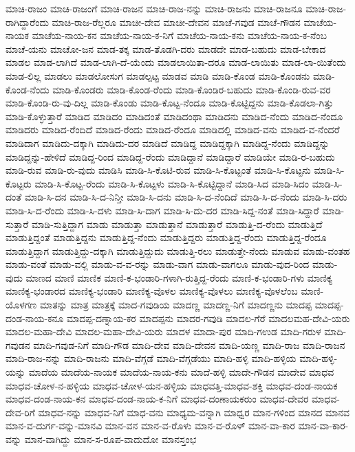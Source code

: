 {ಮಾಚಿ-ರಾಜಂ
ಮಾಚಿ-ರಾಜಂಗೆ
ಮಾಚಿ-ರಾಜನ
ಮಾಚಿ-ರಾಜ-ನನ್ನು
ಮಾಚಿ-ರಾಜನು
ಮಾಚಿ-ರಾಜನೂ
ಮಾಚಿ-ರಾಜ-ರಾಗಿದ್ದಾರೆಂದು
ಮಾಚಿ-ರಾಜ-ರೆಲ್ಲರೂ
ಮಾಚೀ-ದೇವ
ಮಾಚೀ-ದೇವನ
ಮಾಚೆ-ಗವುಡ
ಮಾಚೆ-ಗೌಡನ
ಮಾಚೆಯ-ನಾಯಕ
ಮಾಚೆಯ-ನಾಯ-ಕನ
ಮಾಚೆಯ-ನಾಯ-ಕ-ನಿಗೆ
ಮಾಚೆಯ-ನಾಯ-ಕನು
ಮಾಚೆಯ-ನಾಯ-ಕ-ನೆಂಬ
ಮಾಚೆ-ಯನು
ಮಾಚೋ-ಜನ
ಮಾಡ-ತಕ್ಕ
ಮಾಡ-ತೊಡಗಿ-ದರು
ಮಾಡದೇ
ಮಾಡ-ಬಹುದು
ಮಾಡ-ಬೇಕಾದ
ಮಾಡಲ
ಮಾಡ-ಲಾಗಿದೆ
ಮಾಡ-ಲಾಗಿ-ದೆ-ಯೆಂದು
ಮಾಡಲಾಯಿತಾ-ದರೂ
ಮಾಡ-ಲಾಯಿತು
ಮಾಡ-ಲಾ-ಯಿತೆಂದು
ಮಾಡ-ಲಿಲ್ಲ
ಮಾಡಲು
ಮಾಡಲೋಸುಗ
ಮಾಡಲ್ಪಟ್ಟ
ಮಾಡವ
ಮಾಡಿ
ಮಾಡಿ-ಕೊಂಡ
ಮಾಡಿ-ಕೊಂಡನು
ಮಾಡಿ-ಕೊಂಡ-ನೆಂದು
ಮಾಡಿ-ಕೊಂಡರು
ಮಾಡಿ-ಕೊಂಡ-ರೆಂದು
ಮಾಡಿ-ಕೊಂಡಿರ-ಬಹುದು
ಮಾಡಿ-ಕೊಂಡಿ-ರುವ-ವರ
ಮಾಡಿ-ಕೊಂಡಿ-ರು-ವು-ದಿಲ್ಲ
ಮಾಡಿ-ಕೊಂಡು
ಮಾಡಿ-ಕೊಟ್ಟ-ನೆಂದೂ
ಮಾಡಿ-ಕೊಟ್ಟಿದ್ದನು
ಮಾಡಿ-ಕೊಡಲಾ-ಗಿತ್ತು
ಮಾಡಿ-ಕೊಳ್ಳುತ್ತಾರೆ
ಮಾಡಿದ
ಮಾಡಿದಂ
ಮಾಡಿದಂತೆ
ಮಾಡಿದಂಥಾ
ಮಾಡಿದನು
ಮಾಡಿದ-ನೆಂದು
ಮಾಡಿದ-ನೆಂದೂ
ಮಾಡಿದರು
ಮಾಡಿದ-ರೆಂದಿದೆ
ಮಾಡಿದ-ರೆಂದು
ಮಾಡಿದ-ರೆಂದೂ
ಮಾಡಿದಲ್ಲಿ
ಮಾಡಿದ-ವನು
ಮಾಡಿದ-ವ-ನೆಂದರೆ
ಮಾಡಿದಾಗ
ಮಾಡಿದು-ದಕ್ಕಾಗಿ
ಮಾಡಿದು-ದರ
ಮಾಡಿದೆ
ಮಾಡಿದ್ದ
ಮಾಡಿದ್ದಕ್ಕಾಗಿ
ಮಾಡಿದ್ದ-ನೆಂದು
ಮಾಡಿದ್ದನ್ನು
ಮಾಡಿದ್ದನ್ನು-ಹೇಳಿದೆ
ಮಾಡಿದ್ದ-ರಿಂದ
ಮಾಡಿದ್ದ-ರೆಂದು
ಮಾಡಿದ್ದಾನೆ
ಮಾಡಿದ್ದಾರೆ
ಮಾಡಿಯೇ
ಮಾಡಿ-ರ-ಬಹುದು
ಮಾಡಿ-ರುವ
ಮಾಡಿ-ರು-ವುದು
ಮಾಡಿಸಿ
ಮಾಡಿ-ಸಿ-ಕೊಟಿ-ರುವ
ಮಾಡಿ-ಸಿ-ಕೊಟ್ಟಂತೆ
ಮಾಡಿ-ಸಿ-ಕೊಟ್ಟನು
ಮಾಡಿ-ಸಿ-ಕೊಟ್ಟರು
ಮಾಡಿ-ಸಿ-ಕೊಟ್ಟ-ರೆಂದು
ಮಾಡಿ-ಸಿ-ಕೊಟ್ಟಳು
ಮಾಡಿ-ಸಿ-ಕೊಟ್ಟಿದ್ದಾನೆ
ಮಾಡಿ-ಸಿದ
ಮಾಡಿ-ಸಿದಂ
ಮಾಡಿ-ಸಿ-ದಂತೆ
ಮಾಡಿ-ಸಿ-ದನ
ಮಾಡಿ-ಸಿ-ದ-ನಿನ್ತೀ
ಮಾಡಿ-ಸಿ-ದನು
ಮಾಡಿ-ಸಿ-ದ-ನೆಂದಿದೆ
ಮಾಡಿ-ಸಿ-ದ-ನೆಂದು
ಮಾಡಿ-ಸಿ-ದರು
ಮಾಡಿ-ಸಿ-ದ-ರೆಂದು
ಮಾಡಿ-ಸಿ-ದಳು
ಮಾಡಿ-ಸಿ-ದಾಗ
ಮಾಡಿ-ಸಿ-ದು-ದರ
ಮಾಡಿ-ಸಿದ್ದ-ನಂತೆ
ಮಾಡಿ-ಸಿದ್ದಾರೆ
ಮಾಡಿ-ಸುತ್ತಾರೆ
ಮಾಡಿ-ಸುತ್ತಿದ್ದಾಗ
ಮಾಡು
ಮಾಡುತ್ತಾ
ಮಾಡುತ್ತಾನೆ
ಮಾಡುತ್ತಾರೆ
ಮಾಡುತ್ತಿ-ದ-ರೆಂದು
ಮಾಡುತ್ತಿದೆ
ಮಾಡುತ್ತಿದ್ದಂತೆ
ಮಾಡುತ್ತಿದ್ದನು
ಮಾಡುತ್ತಿದ್ದ-ನೆಂದು
ಮಾಡುತ್ತಿದ್ದರು
ಮಾಡುತ್ತಿದ್ದ-ರೆಂದು
ಮಾಡುತ್ತಿದ್ದ-ರೆಂದೂ
ಮಾಡುತ್ತಿದ್ದಾಗ
ಮಾಡುತ್ತಿದ್ದು-ದಕ್ಕಾಗಿ
ಮಾಡುತ್ತಿದ್ದುದು
ಮಾಡುತ್ತಿ-ರಲು
ಮಾಡುತ್ತೇ-ನೆಂದು
ಮಾಡುವ
ಮಾಡು-ವಂತಹ
ಮಾಡು-ವಂತೆ
ಮಾಡು-ವಲ್ಲಿ
ಮಾಡು-ವ-ವ-ರನ್ನು
ಮಾಡು-ವಾಗ
ಮಾಡು-ವಾಗಲೂ
ಮಾಡು-ವುದ-ರಿಂದ
ಮಾಡು-ವುದು
ಮಾಣದ
ಮಾಣಿ
ಮಾಣಿಕ
ಮಾಣಿ-ಕ-ಭಂಡಾರಿ-ಗಳಾಗಿ-ರುತ್ತಿದ್ದ-ರೆಂದು
ಮಾಣಿ-ಕ-ಭಂಡಾರಿ-ಗಳು
ಮಾಣಿಕ್ಯ
ಮಾಣಿಕ್ಯ-ಭಂಡಾರದ
ಮಾಣಿಕ್ಯ-ಭಂಡಾರಿ
ಮಾಣಿಕ್ಯ-ವೊಳಲ
ಮಾಣಿಕ್ಯ-ವೊಳಲು
ಮಾಣಿಕ್ಯ-ವೊಳಲೆಂಬ
ಮಾಣಿ-ಯೊಳಗಣ
ಮಾತನ್ನು
ಮಾತ್ರ
ಮಾತ್ರಕ್ಕೆ
ಮಾದ-ಗವುಡಿಯ
ಮಾದಣ್ಣ
ಮಾದಣ್ಣ-ನಿಗೆ
ಮಾದಣ್ಣನು
ಮಾದಪ್ಪ
ಮಾದಪ್ಪ-ದಂಡ-ನಾಯ-ಕನೂ
ಮಾದಪ್ಪ-ದಣ್ನಾಯ-ಕರ
ಮಾದಪ್ಪನು
ಮಾದರ-ಗವುಡಿ
ಮಾದಲ-ಗೆರೆ
ಮಾದಲಮಹ-ದೇವಿ-ಯರು
ಮಾದಲ-ಮಹಾ-ದೇವಿ
ಮಾದಲ-ಮಹಾ-ದೇವಿ-ಯರು
ಮಾದಳ
ಮಾದಾ-ಪುರ
ಮಾದಿ-ಗಉಡ
ಮಾದಿ-ಗರುಳ
ಮಾದಿ-ಗವುಡನ
ಮಾದಿ-ಗವುಡ-ನಿಗೆ
ಮಾದಿ-ಗೌಡ
ಮಾದಿ-ದೇವ
ಮಾದಿ-ದೇವನ
ಮಾದಿ-ಯಣ್ಣ
ಮಾದಿ-ರಾಜ
ಮಾದಿ-ರಾಜನ
ಮಾದಿ-ರಾಜ-ನನ್ನು
ಮಾದಿ-ರಾಜನು
ಮಾದಿ-ವೆಗ್ಗಡೆ
ಮಾದಿ-ವೆಗ್ಗಡೆಯು
ಮಾದಿ-ಹಳ್ಳಿ
ಮಾದಿ-ಹಳ್ಳಿಯ
ಮಾದಿ-ಹಳ್ಳಿ-ಯನ್ನು
ಮಾದೆಯ
ಮಾದೆಯ-ನಾಯಕ
ಮಾದೆಯ-ನಾಯ-ಕನು
ಮಾದೆ-ಹಳ್ಳಿ
ಮಾದೇ-ಗೌಡನ
ಮಾದೇವ
ಮಾಧವ
ಮಾಧವ-ಚೋಳ-ನ-ಹಳ್ಳಿಯ
ಮಾಧವ-ಚೋಳ-ಯನ-ಹಳ್ಳಿಯ
ಮಾಧವತ್ತಿ-ಮಾಧವ-ಶಕ್ತಿ
ಮಾಧವ-ದಂಡ-ನಾಯಕ
ಮಾಧವ-ದಂಡ-ನಾಯ-ಕನ
ಮಾಧವ-ದಂಡ-ನಾಯ-ಕ-ನಿಗೆ
ಮಾಧವ-ದಂಣಾಯಕರುಂ
ಮಾಧವ-ದೇವರ
ಮಾಧವ-ದೇವ-ರಿಗೆ
ಮಾಧವ-ನನ್ನು
ಮಾಧವ-ನಿಗೆ
ಮಾಧ-ವನು
ಮಾಧ್ಯಮ-ವನ್ನಾಗಿ
ಮಾಧ್ವರ
ಮಾನ-ಗಳಿಂದ
ಮಾನದ
ಮಾನವ
ಮಾನ-ವ-ದುರ್ಗ-ವನ್ನು-ಮಾನವಿ
ಮಾನ-ವನ
ಮಾನ-ವ-ರೊಳು
ಮಾನ-ವ-ರೊಳ್
ಮಾನ-ವಾ-ಕಾರ
ಮಾನ-ವಾ-ಕಾರ-ವನ್ನು
ಮಾನ-ವಾಗಿದ್ದು
ಮಾನ-ಸ-ರೂಪ-ವಾದುದೋ
ಮಾನಸ್ತಂಭ
}
